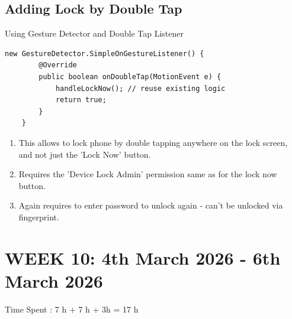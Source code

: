 \documentclass{article}
\begin{document}
\subsection{Adding Lock by Double Tap}
Using Gesture Detector and Double Tap Listener \cite{Android_GestureDetector}
\begin{lstlisting}[caption={UI Feature - Double Tap Listener},label={label: Double Tap Listener}]
    new GestureDetector.SimpleOnGestureListener() {
        @Override
        public boolean onDoubleTap(MotionEvent e) {
            handleLockNow(); // reuse existing logic
            return true;
        }
    }
\end{lstlisting} 
\begin{enumerate}
    \item This allows to lock phone by double tapping anywhere on the lock screen, and not just the 'Lock Now' button.
    \item Requires the 'Device Lock Admin' permission same as for the lock now button.
    \item Again requires to enter password to unlock again - can't be unlocked via fingerprint. 
\end{enumerate} 

\newpage
\section{WEEK 10: 4th March 2026 - 6th March 2026}
Time Spent : 7 h + 7 h + 3h = 17 h
\end{document}
